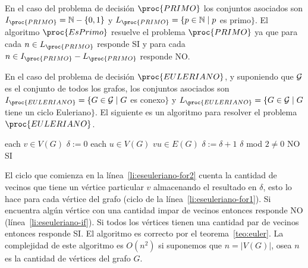 \begin{ejemplo}
En el caso del problema de decisión $\proc{PRIMO}$ los conjuntos asociados son $I_{\proc{PRIMO}}=\N-\{0,1\}$ y $L_{\proc{PRIMO}}=\{p\in\N\;|\;p$ es primo$\}$.
El algoritmo $\proc{EsPrimo}$ resuelve el problema $\proc{PRIMO}$ ya que para cada $n\in L_{\proc{PRIMO}}$ responde SI y para cada $n\in I_{\proc{PRIMO}}-L_{\proc{PRIMO}}$ responde NO.

En el caso del problema de decisión $\proc{EULERIANO}$, y suponiendo que $\mathcal{G}$ es el conjunto de todos los grafos, los conjuntos asociados son $I_{\proc{EULERIANO}}=\{G\in\G\;|\; G$ es conexo$\}$ y $L_\proc{EULERIANO}=\{G\in\G\;|\;G$ tiene un ciclo Euleriano$\}$.
El siguiente es un algoritmo para resolver el problema $\proc{EULERIANO}$.
\begin{codebox}
\li \For each $v\in V(G)$ \label{li:eseuleriano-for1}
\li \> $\delta:=0$
\li \> \For each $u\in V(G)$ \label{li:eseuleriano-for2}
\li \> \> \If $vu\in E(G)$ \Then
\li \> \> \> $\delta:=\delta+1$
\li \> \If $\delta$ mod $2\not=0$ \Then \label{li:eseuleriano-if}
\li \> \> \Return NO
\li \Return SI
\end{codebox}
El ciclo que comienza en la línea~\ref{li:eseuleriano-for2} cuenta la cantidad de vecinos que tiene un vértice particular $v$ almacenando el resultado en $\delta$, esto lo hace para cada vértice del grafo (ciclo de la línea~\ref{li:eseuleriano-for1}).
Si encuentra algún vértice con una cantidad impar de vecinos entonces responde NO (línea~\ref{li:eseuleriano-if}).
Si todos los vértices tienen una cantidad par de vecinos entonces responde SI.
El algoritmo es correcto por el teorema~\ref{teo:euler}.
La complejidad de este algoritmo es $O(n^2)$ si suponemos que $n=|V(G)|$, osea $n$ es la cantidad de vértices del grafo $G$.
\end{ejemplo}

